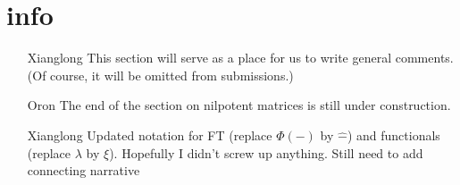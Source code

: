 \section*{info}
\begin{itemize}
	\item[Xianglong] This section will serve as a place for us to write general comments. (Of course, it will be omitted from submissions.)

    \item[Oron] The end of the section on nilpotent matrices is still under construction.
    
    \item[Xianglong] Updated notation for FT (replace $\Phi(-)$ by $\widehat{-}$) and functionals (replace $\lambda$ by $\xi$). Hopefully I didn't screw up anything. Still need to add connecting narrative
\end{itemize}
\newpage

